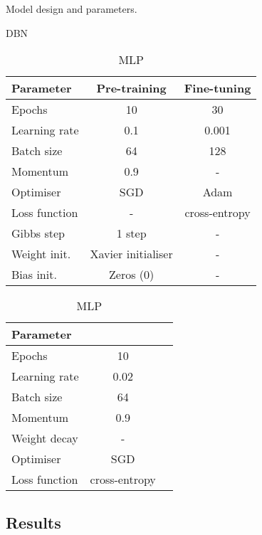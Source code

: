 \documentclass[runningheads]{llncs}
\begin{document}
\begin{table}[t]
\caption{Model design and parameters.}
\label{tab:model_design_parameters}
    \begin{subtable}[t]{0.5\textwidth}
        \centering
        \caption{DBN}
        \label{tab:dbn_parameters}
        \begin{tabular}[t]{lcc}
        \toprule
        Parameter       & Pre-training       & Fine-tuning\\
        \midrule
        Epochs          & 10                 & 30\\
        Learning rate   & 0.1                & 0.001\\
        Batch size      & 64                 & 128\\
        Momentum        & 0.9                & -\\
        Optimiser       & SGD                & Adam\\
        Loss function   & -                  & cross-entropy\\
        Gibbs step      & 1 step             & -\\
        Weight init.    & Xavier initialiser & -\\
        Bias init.      & Zeros (0)          & -\\
        \bottomrule
        \end{tabular}
    \end{subtable}
    \hfill
    \begin{subtable}[t]{0.35\textwidth}
        \centering
        \caption{MLP}
        \label{tab:mlp_parameters}
        \begin{tabular}[t]{lcc}
        \toprule
        Parameter & \\
        \midrule
        Epochs             & 10\\
        Learning rate      & 0.02\\
        Batch size         & 64\\
        Momentum           & 0.9\\
        Weight decay       & -\\
        Optimiser          & SGD\\
        Loss function      & cross-entropy\\
        \bottomrule
        \end{tabular}
    \end{subtable}
\end{table}

\subsection{Results}
\label{subsec:results}
\end{document}
